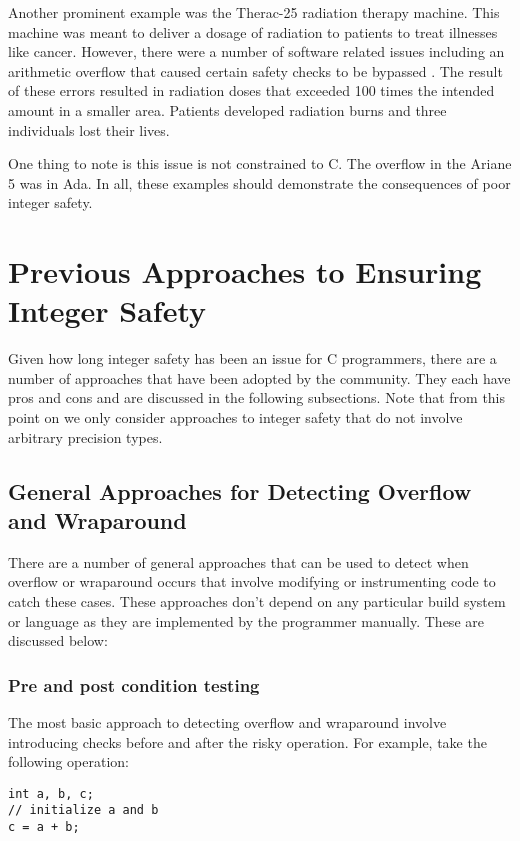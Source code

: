 Another prominent example was the Therac-25 radiation therapy machine. This machine was meant to deliver a dosage of radiation to patients to treat illnesses like cancer. However, there were a number of software related issues including an arithmetic overflow that caused certain safety checks to be bypassed \cite{therac}. The result of these errors resulted in radiation doses that exceeded 100 times the intended amount in a smaller area. Patients developed radiation burns and three individuals lost their lives.

One thing to note is this issue is not constrained to C. The overflow in the Ariane 5 was in Ada. In all, these examples should demonstrate the consequences of poor integer safety.

\section{Previous Approaches to Ensuring Integer Safety}

Given how long integer safety has been an issue for C programmers, there are a number of approaches that have been adopted by the community. They each have pros and cons and are discussed in the following subsections. Note that from this point on we only consider approaches to integer safety that do not involve arbitrary precision types.

\subsection{General Approaches for Detecting Overflow and Wraparound}

There are a number of general approaches that can be used to detect when overflow or wraparound occurs that involve modifying or instrumenting code to catch these cases. These approaches don't depend on any particular build system or language as they are implemented by the programmer manually. These are discussed below:

\subsubsection{Pre and post condition testing}
The most basic approach to detecting overflow and wraparound involve introducing checks before and after the risky operation. For example, take the following operation:

\begin{center}
\parbox{0.9\linewidth}{
\texttt{int a, b, c;\\
// initialize a and b\\
c = a + b;}
}
\end{center}

